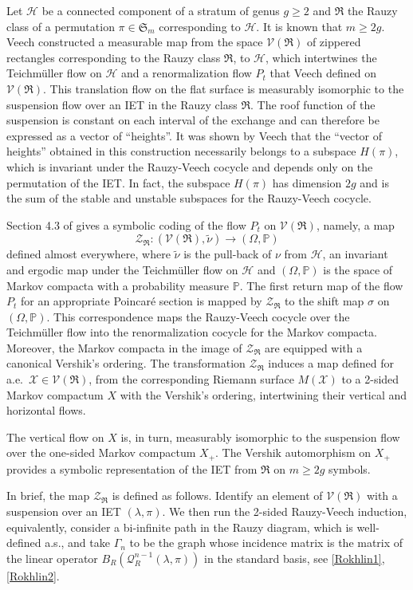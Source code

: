 \documentclass[JEP,XML,SOM,Unicode]{cedram}
\let\mathcal\mathscr
\theoremstyle{plain}
\theoremstyle{definition}
\let\wt\widetilde
\let\lam\lambda
\let\Om\Omega
\let\Gam\Gamma
\newcommand\FrR{\mathfrak{R}}
\newcommand\Frs{\mathfrak{S}}
\newcommand\Hk{\mathcal{H}}
\newcommand\Qk{\mathcal{Q}}
\newcommand\Vk{\mathcal{V}}
\newcommand\Xk{\mathcal{X}}
\newcommand\Zk{\mathcal{Z}}
\renewcommand{\P}{\mathbb{P}}
\newcommand\be{\begin{equation}}
\newcommand\ee{\end{equation}}
\begin{document}
Let $\Hk$ be a connected component of a stratum of genus $g\ge 2$ and $\FrR$ the Rauzy class of a permutation $\pi\in \Frs_m$ corresponding to $\Hk$. It is known that $m\ge 2g$.
Veech \cite{veech}
constructed a measurable map from the space $\Vk(\FrR)$ of
zippered rectangles corresponding to the Rauzy class $\FrR$, to $\Hk$, which intertwines the Teichmüller flow on $\Hk$ and a renormalization flow $P_t$ that Veech defined on $\Vk(\FrR)$. This translation flow on the flat surface is measurably isomorphic to the suspension flow over an IET in the Rauzy class $\FrR$. The roof function of the suspension is constant on each interval of the exchange and can therefore be expressed as a vector of ``heights''.
It was shown by Veech \cite{veechamj} that the ``vector of heights'' obtained in this construction necessarily belongs to a subspace $H(\pi)$, which is invariant under the Rauzy-Veech cocycle and depends only on the permutation of the IET. In fact, the subspace $H(\pi)$ has dimension $2g$ and is the sum of the stable and unstable subspaces for the Rauzy-Veech cocycle.

Section 4.3 of \cite{Buf-umn} gives a symbolic coding of the flow $P_t$ on $\Vk(\FrR)$, namely, a map
\be \label{map-veech}
\Zk_{\FrR}: (\Vk(\FrR),\wt\nu) \to (\Om,\P)
\ee
defined almost everywhere, where $\wt\nu$ is the pull-back of $\nu$ from $\Hk$, an invariant and ergodic map under the Teichmüller flow on
$\Hk$ and $(\Om,\P)$ is the space of Markov compacta with a probability measure $\P$.
The first return map of the flow $P_t$ for an appropriate Poincaré section is mapped by $\Zk_\FrR$ to the shift map $\sigma$ on $(\Om,\P)$. This correspondence maps the Rauzy-Veech cocycle over the Teichmüller flow into the renormalization cocycle for the Markov compacta. Moreover, the Markov compacta in the image of $\Zk_{\FrR}$ are equipped with a
canonical Vershik's ordering.
The transformation $\Zk_\FrR$ induces a map defined for a.e.\ $\Xk\in \Vk(\FrR)$, from the corresponding Riemann surface $M(\Xk)$ to a 2-sided Markov compactum $X$ with the Vershik's ordering, intertwining their vertical and horizontal flows.

The vertical flow on $X$ is, in turn, measurably isomorphic to the suspension flow over the one-sided Markov compactum $X_+$. The Vershik automorphism on $X_+$ provides a symbolic representation of the IET from $\FrR$ on $m\ge 2g$ symbols.

In brief, the map $\Zk_\FrR$ is defined as follows. Identify an element of $\Vk(\FrR)$ with a suspension over an IET $(\lam,\pi)$.
We then run the 2-sided Rauzy-Veech induction, equivalently, consider a bi-infinite path in the Rauzy diagram, which is well-defined a.s., and take
$\Gam_n$ to be the graph whose incidence matrix is the matrix of the linear operator $B_R(\Qk^{n-1}_R(\lam,\pi))$ in the standard basis, see \eqref{Rokhlin1}, \eqref{Rokhlin2}.
\end{document}

